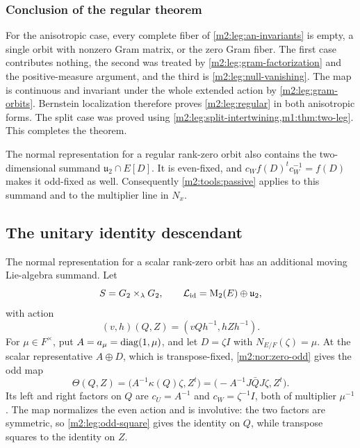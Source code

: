 \subsubsection{Conclusion of the regular theorem}

For the anisotropic case, every complete fiber of
\eqref{m2:leg:an-invariants} is empty, a single orbit with nonzero Gram
matrix, or the zero Gram fiber. The first case contributes nothing,
the second was treated by \cref{m2:leg:gram-factorization} and the
positive-measure argument, and the third is
\eqref{m2:leg:null-vanishing}. The map is continuous and invariant
under the whole extended action by \cref{m2:leg:gram-orbits}.
Bernstein localization therefore proves \cref{m2:leg:regular} in both
anisotropic forms. The split case was proved using
\cref{m2:leg:split-intertwining,m1:thm:two-leg}. This completes the theorem.

The normal representation for a regular rank-zero orbit also
contains the two-dimensional summand
$\mathfrak u_2\cap E[D]$. It is even-fixed, and
$c_Wf(D)^tc_W^{-1}=f(D)$ makes it odd-fixed as well.
Consequently \cref{m2:tools:passive} applies to this summand and to the
multiplier line in $N_x$.

\subsection{The unitary identity descendant}\label{m2:id:section}\label{m2:sec:identity}

The normal representation for a scalar rank-zero orbit has
an additional moving Lie-algebra summand. Let
\[
 S=G_2\times_\lambda G_2,\qquad
 \mathcal L_{\mathrm{id}}=\operatorname{M}_2(E)\oplus\mathfrak u_2,
\]
with action
\begin{equation}\label{m2:id:action}
 (v,h)(Q,Z)=(vQh^{-1},hZh^{-1}).
\end{equation}
For $\mu\in F^\times$, put $A=a_\mu=\operatorname{diag}(1,\mu)$,
and let $D=\zeta I$ with $N_{E/F}(\zeta)=\mu$.
At the scalar representative $A\oplus D$, which is transpose-fixed,
\cref{m2:nor:zero-odd} gives the odd map
\begin{equation}\label{m2:id:odd}
 \Theta(Q,Z)=\bigl(A^{-1}\kappa(Q)\zeta,Z^t\bigr)
             =\bigl(-A^{-1}J\bar QJ\zeta,Z^t\bigr).
\end{equation}
Its left and right factors on $Q$ are $c_U=A^{-1}$ and
$c_W=\zeta^{-1}I$, both of multiplier $\mu^{-1}$.
The map normalizes the even action and is involutive: the two
factors are symmetric, so \eqref{m2:leg:odd-square} gives the identity
on $Q$, while transpose squares to the identity on $Z$.

